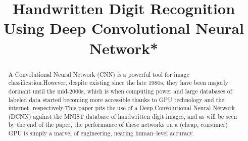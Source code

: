 \documentclass[conference]{IEEEtran}
\begin{document}
\title{Handwritten Digit Recognition Using Deep Convolutional Neural Network*}




\author{

\and


\and

}

\maketitle
\begin{abstract}
    A Convolutional Neural Network (CNN) is a powerful tool for image classification.\@ However, despite existing since the late 1980s, they have been majorly dormant until the mid-2000s, which is when computing power and large databases of labeled data started becoming more accessible thanks to GPU technology and the internet, respectively.\@ This paper pits the use of a Deep Convolutional Neural Network (DCNN) against the MNIST database of handwritten digit images, and as will be seen by the end of the paper, the performance of these networks on a (cheap, consumer) GPU is simply a marvel of engineering, nearing human--level accuracy.
\end{abstract}
\end{document}
